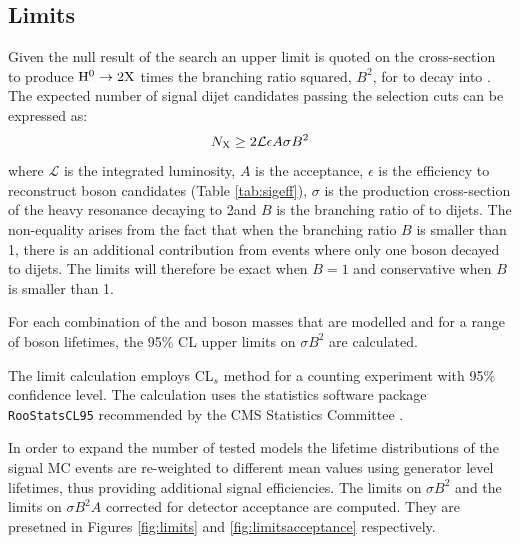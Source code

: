 \subsection{Limits}
\label{subsec:limits}

Given the null result of the search an upper limit is quoted on the cross-section 
to produce $\Higgs \to 2\X$ times the branching ratio squared, $B^2$, for \X to decay into \qq. 
The expected number of signal dijet candidates passing the selection cuts can be expressed as:
\begin{equation}
N_\mathrm{X} \geq 2 \mathcal{L}\epsilon A\sigma B^2
\end{equation}
where $\mathcal{L}$ is the integrated luminosity, $A$ is the acceptance,
 $\epsilon$ is the efficiency to reconstruct \X boson candidates
(Table \ref{tab:sigeff}), $\sigma$ is the production cross-section of the heavy resonance decaying to 2\X and 
$B$ is the branching ratio of \X to dijets. The non-equality arises from the fact that when the branching ratio $B$
is smaller than 1, there is an additional contribution from events where only one \X boson decayed to dijets. 
The limits will therefore be exact when $B=1$ and conservative when $B$ is smaller than 1.
 

For each combination of the \Higgs and \X boson masses that are modelled and for a range of \X boson lifetimes,
the 95\% CL upper limits on $\sigma B^2$ are calculated.
  
 The limit calculation employs CL$_s$ method \cite{Read:2002hq} for a counting
experiment with 95\% confidence level. The calculation uses the statistics software 
package {\tt RooStatsCL95} recommended by
 the CMS Statistics Committee \cite{RooStatsCL95}. 

In order to expand the number of tested models
the lifetime distributions of the signal MC events are re-weighted to different
mean values using generator level lifetimes, thus providing additional signal efficiencies. 
The limits on $\sigma B^2$ and the limits on $\sigma B^2 A$ corrected for detector acceptance are computed. 
They are presetned in Figures
\ref{fig:limits} and \ref{fig:limitsacceptance} respectively.

